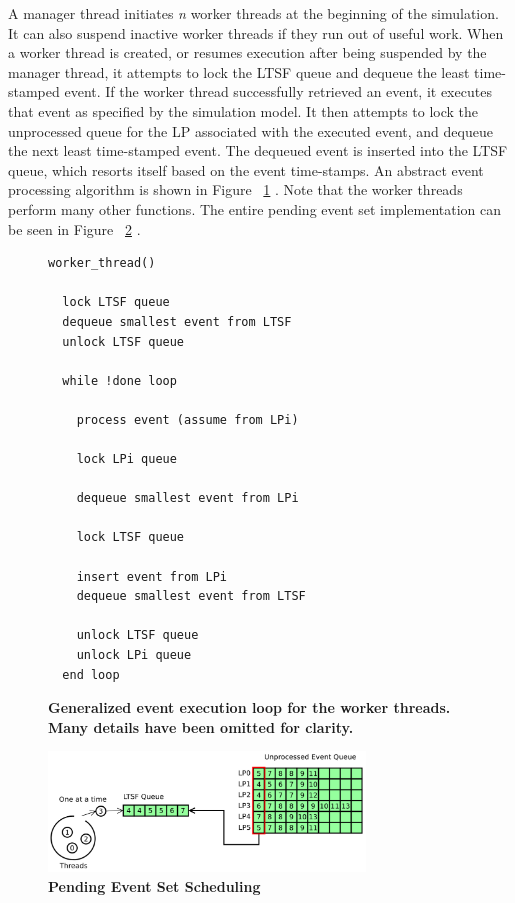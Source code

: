 \documentclass[11pt]{book}
\begin{document}
A manager thread initiates \emph{n} worker threads at the beginning of the simulation.
It can also suspend inactive worker threads if they run out of useful work.  When a worker
thread is created, or resumes execution after being suspended by the manager thread, it
attempts to lock the LTSF queue and dequeue the least time-stamped event.  If the worker
thread successfully retrieved an event, it executes that event as specified by the
simulation model.  It then attempts to lock the unprocessed queue for the LP associated
with the executed event, and dequeue the next least time-stamped event.  The dequeued
event is inserted into the LTSF queue, which resorts itself based on the event
time-stamps.  An abstract event processing algorithm is shown in Figure
~\ref{workerThreadAlgorithm} \cite{dickman}.  Note that the worker threads perform many
other functions.  The entire pending event set implementation can be seen in Figure
~\ref{fig:singleLTSFqueue} \cite{dickman}.

\linespread{1.0}
\begin{figure}
\begin{verbatim}
worker_thread()

  lock LTSF queue
  dequeue smallest event from LTSF
  unlock LTSF queue

  while !done loop

    process event (assume from LPi)

    lock LPi queue 

    dequeue smallest event from LPi

    lock LTSF queue

    insert event from LPi
    dequeue smallest event from LTSF

    unlock LTSF queue
    unlock LPi queue
  end loop
\end{verbatim}
\caption{\textbf{Generalized event execution loop for the worker threads.  Many details
    have been omitted for clarity.}}\label{workerThreadAlgorithm}
\end{figure}

\begin{figure}[H]
    \centering
    \graphicspath{ {./figures/} }
    \includegraphics[width=0.75\textwidth,keepaspectratio]{single_ltsf_queue}
    \caption{\textbf{Pending Event Set Scheduling}}\label{fig:singleLTSFqueue}
\end{figure}
\end{document}
